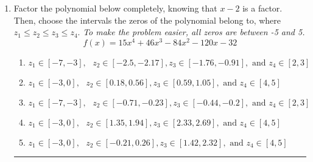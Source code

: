 \documentclass[14pt]{extbook}
\newcommand{\litem}[1]{\item#1\hspace*{-1cm}\rule{\textwidth}{0.4pt}}
\begin{document}
\begin{enumerate}
{\begin{enumerate}[label=\Alph*.]
\end{enumerate} }
\litem{
Factor the polynomial below completely, knowing that $x-2$ is a factor. Then, choose the intervals the zeros of the polynomial belong to, where $z_1 \leq z_2 \leq z_3 \leq z_4$. \textit{To make the problem easier, all zeros are between -5 and 5.}\[ f(x) = 15x^{4} +46 x^{3} -84 x^{2} -120 x -32 \]\begin{enumerate}[label=\Alph*.]
\item \( z_1 \in [-7, -3], \text{   }  z_2 \in [-2.5, -2.17], z_3 \in [-1.76, -0.91], \text{   and   } z_4 \in [2, 3] \)
\item \( z_1 \in [-3, 0], \text{   }  z_2 \in [0.18, 0.56], z_3 \in [0.59, 1.05], \text{   and   } z_4 \in [4, 5] \)
\item \( z_1 \in [-7, -3], \text{   }  z_2 \in [-0.71, -0.23], z_3 \in [-0.44, -0.2], \text{   and   } z_4 \in [2, 3] \)
\item \( z_1 \in [-3, 0], \text{   }  z_2 \in [1.35, 1.94], z_3 \in [2.33, 2.69], \text{   and   } z_4 \in [4, 5] \)
\item \( z_1 \in [-3, 0], \text{   }  z_2 \in [-0.21, 0.26], z_3 \in [1.42, 2.32], \text{   and   } z_4 \in [4, 5] \)

\end{enumerate} }
\end{enumerate}
\end{document}
